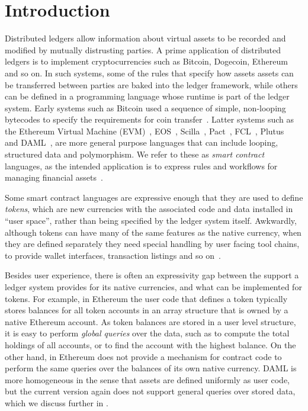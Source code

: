
\section{Introduction}
Distributed ledgers allow information about virtual assets to be recorded and modified by mutually distrusting parties. A prime application of distributed ledgers is to implement cryptocurrencies such as Bitcoin, Dogecoin, Ethereum and so on. In such systems, some of the rules that specify how assets assets can be transferred between parties are baked into the ledger framework, while others can be defined in a programming language whose runtime is part of the ledger system. Early systems such as Bitcoin used a sequence of simple, non-looping bytecodes to specify the requirements for coin transfer~\cite{Atzei2017:BitcoinTransactions}. Latter systems such as the Ethereum Virtual Machine (EVM)~\cite{Wood2014:Ethereum}, EOS~\cite{Grigg2017:EosIntroduction}, Scilla~\cite{Sergey2018:Scilla}, Pact~\cite{Popejpy2016:Pact}, FCL~\cite{Adjoint2019:FCL}, Plutus~\cite{IOHK2018:Plutus} and DAML~\cite{DA2019:DAML}, are more general purpose languages that can include looping, structured data and polymorphism. We refer to these as \emph{smart contract} languages, as the intended application is to express rules and workflows for managing financial assets~\cite{Harz2018:SurveyLanguages}.

Some smart contract languages are expressive enough that they are used to define \emph{tokens}, which are new currencies with the associated code and data installed in ``user space'', rather than being specified by the ledger system itself. Awkwardly, although tokens can have many of the same features as the native currency, when they are defined separately they need special handling by user facing tool chains, to provide wallet interfaces, transaction listings and so on~\cite{Vogelsteller2015:ERC20}.

Besides user experience, there is often an expressivity gap between the support a ledger system provides for its native currencies, and what can be implemented for tokens. For example, in Ethereum the user code that defines a token typically stores balances for all token accounts in an array structure that is owned by a native Ethereum account. As token balances are stored in a user level structure, it is easy to perform \emph{global queries} over the data, such as to compute the total holdings of all accounts, or to find the account with the highest balance. On the other hand, in Ethereum does not provide a mechanism for contract code to perform the same queries over the balances of its own native currency. DAML is more homogeneous in the sense that assets are defined uniformly as user code, but the current version again does not support general queries over stored data, which we discuss further in \REF.

